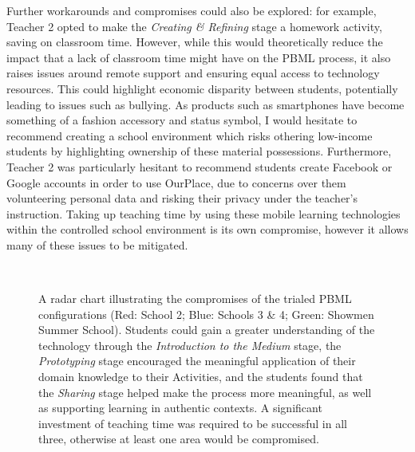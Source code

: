 Further workarounds and compromises could also be explored: for example, Teacher 2 opted to make the \textit{Creating \& Refining} stage a homework activity, saving on classroom time. However, while this would theoretically reduce the impact that a lack of classroom time might have on the PBML process, it also raises issues around remote support and ensuring equal access to technology resources. This could highlight economic disparity between students, potentially leading to issues such as bullying. As products such as smartphones have become something of a fashion accessory and status symbol, I would hesitate to recommend creating a school environment which risks othering low-income students by highlighting ownership of these material possessions. Furthermore, Teacher 2 was particularly hesitant to recommend students create Facebook or Google accounts in order to use OurPlace, due to concerns over them volunteering personal data and risking their privacy under the teacher's instruction. Taking up teaching time by using these mobile learning technologies within the controlled school environment is its own compromise, however it allows many of these issues to be mitigated.

\begin{figure}
\centering
  \caption[A radar chart illustrating the compromises of the different PBML configurations.]{A radar chart illustrating the compromises of the trialed PBML configurations (Red: School 2; Blue: Schools 3 \& 4; Green: Showmen Summer School). Students could gain a greater understanding of the technology through the \textit{Introduction to the Medium} stage, the \textit{Prototyping} stage encouraged the meaningful application of their domain knowledge to their Activities, and the students found that the \textit{Sharing} stage helped make the process more meaningful, as well as supporting learning in authentic contexts. A significant investment of teaching time was required to be successful in all three, otherwise at least one area would be compromised. }~\label{fig:PBMLradar}
\end{figure}

